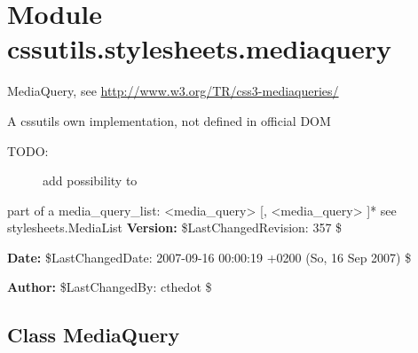 %
%
%


\section{Module cssutils.stylesheets.mediaquery}

    \label{cssutils:stylesheets:mediaquery}

MediaQuery, see \href{http://www.w3.org/TR/css3-mediaqueries/}{http://www.w3.org/TR/css3-mediaqueries/}

A cssutils own implementation, not defined in official DOM
\begin{description}
\item[{TODO:}] \leavevmode 
add possibility to

\end{description}

part of a media{\_}query{\_}list: {\textless}media{\_}query{\textgreater} {[}, {\textless}media{\_}query{\textgreater} {]}*
see stylesheets.MediaList
\textbf{Version:} \$LastChangedRevision: 357 \$



\textbf{Date:} \$LastChangedDate: 2007-09-16 00:00:19 +0200 (So, 16 Sep 2007) \$



\textbf{Author:} \$LastChangedBy: cthedot \$





\subsection{Class MediaQuery}

